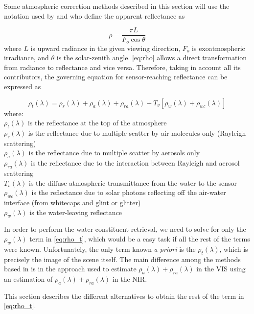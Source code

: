 Some atmospheric correction methods described in this section will use the notation used by \cite{Gordon:1994} and \cite{Ruddick:2000bs} who define the apparent reflectance as 

\begin{equation}\label{eq:rho}
  \rho = \frac{\pi L}{F_o \cos{\theta}}
\end{equation}
where $L$ is upward radiance in the given viewing direction, $F_o$ is exoatmospheric irradiance, and $\theta$ is the solar-zenith angle. \autoref{eq:rho} allows a direct transformation from radiance to reflectance and vice versa. Therefore, taking in account all its contributors, the governing equation for sensor-reaching reflectance can be expressed as

\begin{equation}\label{eq:rho_t}
  \rho_t(\lambda) = \rho_r(\lambda) + \rho_a(\lambda) + \rho_{ra}(\lambda) + T_v[\rho_w(\lambda) + \rho_{wc}(\lambda)]
\end{equation}
where:\\
$\rho_t(\lambda)$ is the reflectance at the top of the atmosphere \\
$\rho_r(\lambda)$ is the reflectance due to multiple scatter by air molecules only (Rayleigh scattering)\\
$\rho_a(\lambda)$ is the reflectance due to multiple scatter by aerosols only\\
$\rho_{ra}(\lambda)$ is the reflectance due to
the interaction between Rayleigh and aerosol scattering\\
$T_v(\lambda)$ is the diffuse atmospheric transmittance from the water to the sensor\\
$\rho_{wc}(\lambda)$ is the reflectance due to solar photons reflecting off the air-water interface (from whitecaps and glint or glitter)\\
$\rho_w(\lambda)$ is the water-leaving reflectance

In order to perform the water constituent retrieval, we need to solve for only the $\rho_w(\lambda)$ term in \autoref{eq:rho_t}, which would be a easy task if all the rest of the terms were known. Unfortunately, the only term known {\it a priori} is the $\rho_t(\lambda)$, which is precisely the image of the scene itself. The main difference among the methods based in \cite{Gordon:1994} is in the approach used to estimate $\rho_a(\lambda) + \rho_{ra}(\lambda)$ in the VIS using an estimation of $\rho_a(\lambda) + \rho_{ra}(\lambda)$ in the NIR.

This section describes the different alternatives to obtain the rest of the term in \autoref{eq:rho_t}.

